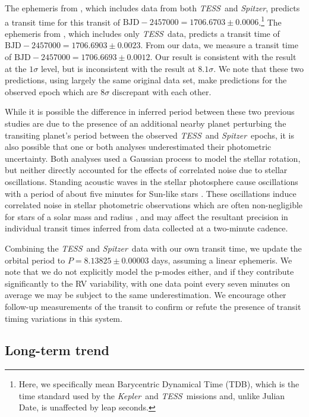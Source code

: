 \documentclass[twocolumn]{aastex63}
\newcommand{\kep}{{\it Kepler}}
\newcommand{\tess}{{\it TESS}}
\newcommand{\spitz}{{\it Spitzer}}
\begin{document}
The ephemeris from \citet{Newton19}, which includes data from both \tess\ and \spitz, predicts a transit time for this transit of $\textrm{BJD}- 2457000 = 1706.6703 \pm 0.0006$.\footnote{Here, we specifically mean Barycentric Dynamical Time (TDB), which is the time standard used by the \kep\ and \tess\ missions and, unlike Julian Date, is unaffected by leap seconds.}
The ephemeris from \citet{Benatti19}, which includes only \tess\ data, predicts a transit time of  $\textrm{BJD}- 2457000 = 1706.6903 \pm 0.0023$. 
From our data, we measure a transit time of $\textrm{BJD}- 2457000 = 1706.6693 \pm  0.0012$. 
Our result is consistent with the \citet{Newton19} result at the $1\sigma$ level, but is inconsistent with the \citet{Benatti19} result at $8.1\sigma$.
We note that these two predictions, using largely the same original data set, make predictions for the observed epoch which are $8\sigma$ discrepant with each other. 

While it is possible the difference in inferred period between these two previous studies are due to the presence of an additional nearby planet perturbing the transiting planet's period between the observed \tess\ and \spitz\ epochs, it is also possible that one or both analyses underestimated their photometric uncertainty. 
Both analyses used a Gaussian process to model the stellar rotation, but neither directly accounted for the effects of correlated noise due to stellar oscillations.
Standing acoustic waves in the stellar photosphere cause oscillations with a period of about five minutes for Sun-like stars \citep{Deubner75}. These oscillations induce correlated noise in stellar photometric observations which are often non-negligible for stars of a solar mass and radius \citep{Chaplin13}, and may affect the resultant precision in individual transit times inferred from data collected at a two-minute cadence. 



Combining the \tess\ and \spitz\ data with our own transit time, we update the orbital period to $P= 8.13825 \pm 0.00003$ days, assuming a linear ephemeris.
We note that we do not explicitly model the p-modes either, and if they contribute significantly to the RV variability, with one data point every seven minutes on average we may be subject to the same underestimation.
We encourage other follow-up measurements of the transit to confirm or refute the presence of transit timing variations in this system.




\subsection{Long-term trend}
\label{sec:trend}
\end{document}
